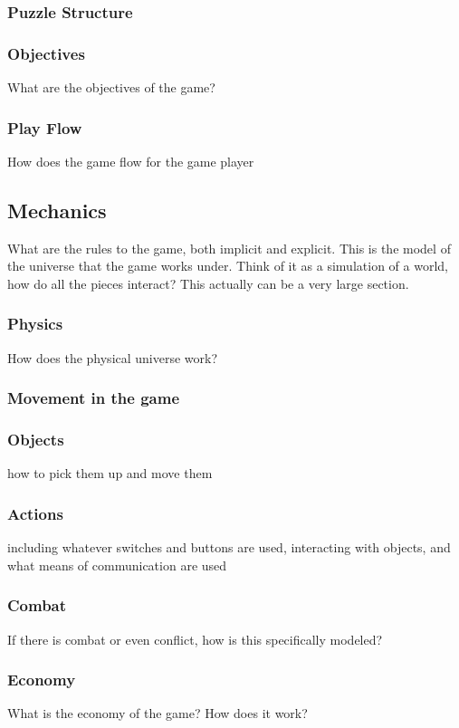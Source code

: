 \documentclass[12pt, letterpaper]{article}
\begin{document}
        \subsubsection{Puzzle Structure}
        \subsubsection{Objectives}
        What are the objectives of the game?
        \subsubsection{Play Flow}
        How does the game flow for the game player
    \subsection{Mechanics}
    What are the rules to the game, both implicit and explicit.  This is the model of the universe that the game works under.  Think of it as a simulation of a world, how do all the pieces interact?  This actually can be a very large section.
        \subsubsection{Physics}
        How does the physical universe work?
        \subsubsection{Movement in the game}
        \subsubsection{Objects}
        how to pick them up and move them 
        \subsubsection{Actions}
        including whatever switches and buttons are used, interacting with objects, and what means of communication are used
        \subsubsection{Combat}
        If there is combat or even conflict, how is this specifically modeled?
        \subsubsection{Economy}
        What is the economy of the game? How does it work?
\end{document}
